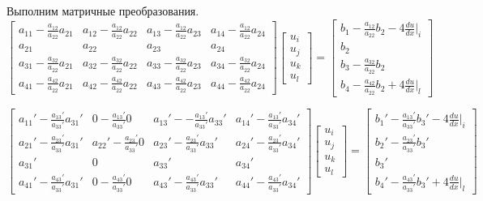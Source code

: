 Выполним матричные преобразования.
$$ \begin{bmatrix}
a_{11} -\frac{a_{12}}{a_{22}}{a_{21}}    &  a_{12} -\frac{a_{12}}{a_{22}}{a_{22}}  &  a_{13} -\frac{a_{12}}{a_{22}}{a_{23}} &  a_{14}-\frac{a_{12}}{a_{22}}{a_{24}}\\
a_{21}     &  a_{22}  &  a_{23} &  a_{24}\\
a_{31} -\frac{a_{32}}{a_{22}}{a_{21}}   &  a_{32}-\frac{a_{32}}{a_{22}}{a_{22}}  &  a_{33}-\frac{a_{32}}{a_{22}}{a_{23}} &  a_{34}-\frac{a_{32}}{a_{22}}{a_{24}}\\
a_{41}  -\frac{a_{42}}{a_{22}}{a_{21}}   &  a_{42} -\frac{a_{42}}{a_{22}}{a_{22}}  & a_{43}-\frac{a_{42}}{a_{22}}{a_{23}}  &  a_{44}-\frac{a_{42}}{a_{22}}{a_{24}}
\end{bmatrix}
\begin{bmatrix}
u_i \\
u_j \\
u_k\\
u_l
\end{bmatrix} =
\begin{bmatrix}
b_1-\frac{a_{12}}{a_{22}}{b_{2}}   -4  \frac{du}{dx}|_i \\
b_2\\
b_3 - \frac{a_{32}}{a_{22}}{b_{2}}\\
b_4 - \frac{a_{42}}{a_{22}}{b_{2}}   +4  \frac{du}{dx}|_l
\end{bmatrix}$$


$$ \begin{bmatrix}
a_{11}'-\frac{a_{13}'}{a_{33}'}a_{31}'   &  0 -\frac{a_{13}'}{a_{33}'}0  &  a_{13}'--\frac{a_{13}'}{a_{33}'}a_{33}' &  a_{14}'-\frac{a_{13}'}{a_{33}'}a_{34}'\\
a_{21}' -\frac{a_{23}'}{a_{33}'}a_{31}'    &  a_{22}' -\frac{a_{23}'}{a_{33}'}0  &  a_{23}' -\frac{a_{23}'}{a_{33}'}a_{33}' &  a_{24}' -\frac{a_{23}'}{a_{33}'}a_{34}'\\
a_{31}'     &  0  &  a_{33}' &  a_{34}'\\
a_{41}'  -\frac{a_{43}'}{a_{33}'}a_{31}'    &  0-\frac{a_{43}'}{a_{33}'}0  & a_{43}'-\frac{a_{43}'}{a_{33}'}a_{33}'  &  a_{44}'-\frac{a_{43}'}{a_{33}'}a_{34}'
\end{bmatrix}
\begin{bmatrix}
u_i \\
u_j \\
u_k\\
u_l
\end{bmatrix} =
\begin{bmatrix}
b_1'-\frac{a_{13}'}{a_{33}'}b_{3}'   -4  \frac{du}{dx}|_i \\
b_2'-\frac{a_{23}'}{a_{33}'}b_{3}'\\
b_3'\\
b_4' -\frac{a_{43}'}{a_{33}'}b_{3}'   +4  \frac{du}{dx}|_l
\end{bmatrix}$$

